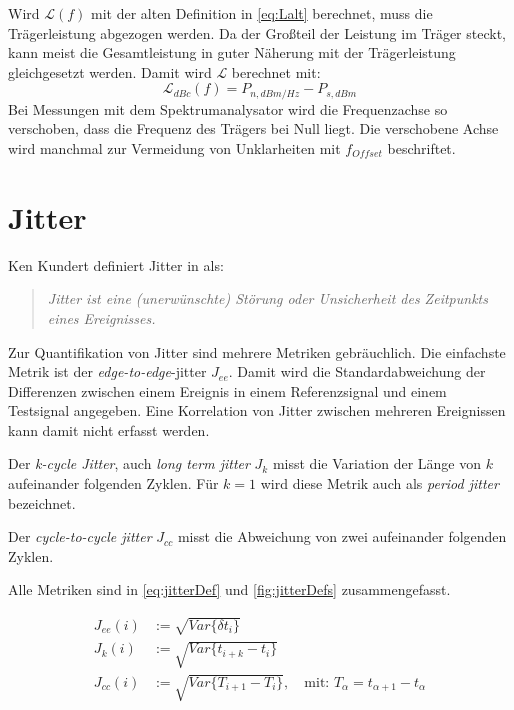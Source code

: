 Wird $\mathscr{L}(f)$ mit der alten Definition in \autoref{eq:Lalt} berechnet, muss die Trägerleistung abgezogen werden.
Da der Großteil der Leistung im Träger steckt, kann meist die Gesamtleistung in guter Näherung mit der Trägerleistung gleichgesetzt werden. Damit wird $\mathscr{L}$ berechnet mit:
\begin{equation}
	\mathscr{L}_{dBc}(f) = P_{n, dBm/Hz} - P_{s, dBm}
\end{equation}
Bei Messungen mit dem Spektrumanalysator wird die Frequenzachse so verschoben, dass die Frequenz des Trägers bei Null liegt. Die verschobene Achse wird manchmal zur Vermeidung von Unklarheiten mit $f_{Offset}$ beschriftet.

\section{Jitter}
Ken Kundert definiert Jitter in \cite{Kundert2012} als:
\begin{quote}
	\textit{Jitter ist eine (unerwünschte) Störung oder Unsicherheit des Zeitpunkts eines Ereignisses. }
\end{quote}

Zur Quantifikation von Jitter sind mehrere Metriken gebräuchlich. Die einfachste Metrik ist der \textit{edge-to-edge}-jitter $J_{ee}$. Damit wird die Standardabweichung der Differenzen zwischen einem Ereignis in einem Referenzsignal und einem Testsignal angegeben. Eine Korrelation von Jitter zwischen mehreren Ereignissen kann damit nicht erfasst werden.

Der \textit{k-cycle Jitter}, auch \textit{long term jitter} $J_k$ misst die Variation der Länge von $k$ aufeinander folgenden Zyklen. Für $k=1$ wird diese Metrik auch als \textit{period jitter} bezeichnet.

Der \textit{cycle-to-cycle jitter} $J_{cc}$ misst die Abweichung von zwei aufeinander folgenden Zyklen.

Alle Metriken sind in \autoref{eq:jitterDef} und \autoref{fig:jitterDefs} zusammengefasst.

\begin{subequations}
	\label{eq:jitterDef}
	\begin{align}
	J_{ee}(i)&:=\sqrt{Var\{\delta t_i\}} \\
	J_k(i)&:=\sqrt{Var\{t_{i+k}-t_i\}} \\
	J_{cc}(i)&:=\sqrt{Var\{T_{i+1}-T_i\}}, \quad \text{mit: } T_\alpha=t_{\alpha+1}-t_\alpha
	\end{align}
\end{subequations}

